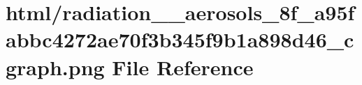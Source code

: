 \hypertarget{radiation____aerosols__8f__a95fabbc4272ae70f3b345f9b1a898d46__cgraph_8png}{}\section{html/radiation\+\_\+\+\_\+aerosols\+\_\+8f\+\_\+a95fabbc4272ae70f3b345f9b1a898d46\+\_\+cgraph.png File Reference}
\label{radiation____aerosols__8f__a95fabbc4272ae70f3b345f9b1a898d46__cgraph_8png}
